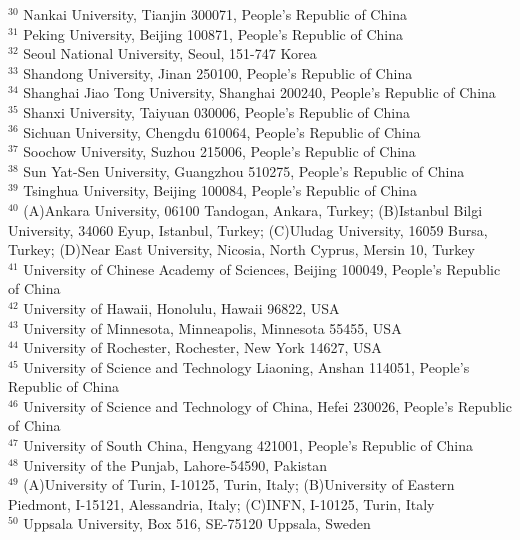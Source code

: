 {\begin{small}
\begin{center}
{$^{30}$ Nankai University, Tianjin 300071, People's Republic of China\\
$^{31}$ Peking University, Beijing 100871, People's Republic of China\\
$^{32}$ Seoul National University, Seoul, 151-747 Korea\\
$^{33}$ Shandong University, Jinan 250100, People's Republic of China\\
$^{34}$ Shanghai Jiao Tong University, Shanghai 200240, People's Republic of China\\
$^{35}$ Shanxi University, Taiyuan 030006, People's Republic of China\\
$^{36}$ Sichuan University, Chengdu 610064, People's Republic of China\\
$^{37}$ Soochow University, Suzhou 215006, People's Republic of China\\
$^{38}$ Sun Yat-Sen University, Guangzhou 510275, People's Republic of China\\
$^{39}$ Tsinghua University, Beijing 100084, People's Republic of China\\
$^{40}$ (A)Ankara University, 06100 Tandogan, Ankara, Turkey; (B)Istanbul Bilgi University, 34060 Eyup, Istanbul, Turkey; (C)Uludag University, 16059 Bursa, Turkey; (D)Near East University, Nicosia, North Cyprus, Mersin 10, Turkey\\
$^{41}$ University of Chinese Academy of Sciences, Beijing 100049, People's Republic of China\\
$^{42}$ University of Hawaii, Honolulu, Hawaii 96822, USA\\
$^{43}$ University of Minnesota, Minneapolis, Minnesota 55455, USA\\
$^{44}$ University of Rochester, Rochester, New York 14627, USA\\
$^{45}$ University of Science and Technology Liaoning, Anshan 114051, People's Republic of China\\
$^{46}$ University of Science and Technology of China, Hefei 230026, People's Republic of China\\
$^{47}$ University of South China, Hengyang 421001, People's Republic of China\\
$^{48}$ University of the Punjab, Lahore-54590, Pakistan\\
$^{49}$ (A)University of Turin, I-10125, Turin, Italy; (B)University of Eastern Piedmont, I-15121, Alessandria, Italy; (C)INFN, I-10125, Turin, Italy\\
$^{50}$ Uppsala University, Box 516, SE-75120 Uppsala, Sweden\\
}
\end{center}
\end{small}}

